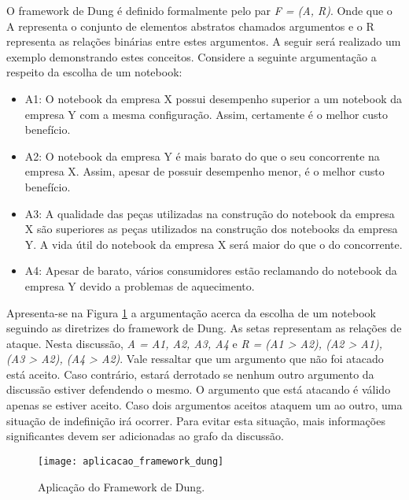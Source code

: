 O framework de Dung é definido formalmente pelo par \textit{F = (A, R)}. Onde que o A representa o conjunto de elementos abstratos chamados argumentos e o R representa as relações binárias entre estes argumentos. A seguir será realizado um exemplo demonstrando estes conceitos. Considere a seguinte argumentação a respeito da escolha de um notebook:

\begin{itemize}

\item A1: O notebook da empresa X possui desempenho superior a um notebook da empresa Y com a mesma configuração. Assim, certamente é o melhor custo benefício.

\item A2: O notebook da empresa Y é mais barato do que o seu concorrente na empresa X. Assim, apesar de possuir desempenho menor, é o melhor custo benefício.

\item A3: A qualidade das peças utilizadas na construção do notebook da empresa X são superiores as peças utilizados na construção dos notebooks da empresa Y. A vida útil do notebook da empresa X será maior do que o do concorrente. 

\item A4: Apesar de barato, vários consumidores estão reclamando do notebook da empresa Y devido a problemas de aquecimento.

\end{itemize}

Apresenta-se na Figura \ref{aplicacao_framework_dung} a argumentação acerca da escolha de um notebook seguindo as diretrizes do framework de Dung. As setas representam as relações de ataque. Nesta discussão, \textit{A = {A1, A2, A3, A4}} e \textit{R = {(A1 > A2), (A2 > A1), (A3 > A2), (A4 > A2)}}. Vale ressaltar que um argumento que não foi atacado está aceito. Caso contrário, estará derrotado se nenhum outro argumento da discussão estiver defendendo o mesmo. O argumento que está atacando é válido apenas se estiver aceito. Caso dois argumentos aceitos ataquem um ao outro, uma situação de indefinição irá ocorrer. Para evitar esta situação, mais informações significantes devem ser adicionadas ao grafo da discussão.

\graphicspath{{figuras/}}
\begin{figure}[H]
\centering
\texttt{[image: aplicacao\_framework\_dung]}
\caption{Aplicação do Framework de Dung.} 
\label{aplicacao_framework_dung}
\end{figure}

